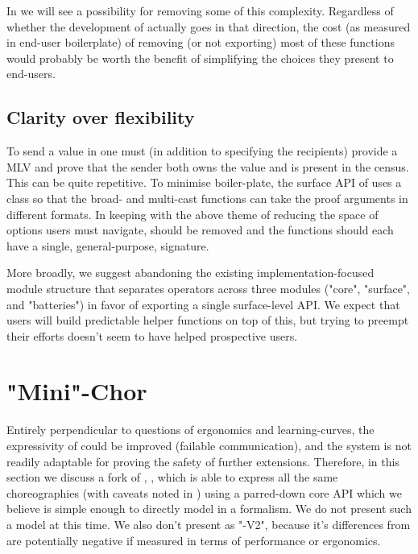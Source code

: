 In  we will see a possibility for removing some of this complexity.
Regardless of whether the development of \MultiChor actually goes in that direction,
the cost (as measured in end-user boilerplate) of removing (or not exporting) most of these functions
would probably be worth the benefit of simplifying the choices they present to end-users.

\subsection{Clarity over flexibility}

To send a value in \MultiChor one must (in addition to specifying the recipients)
provide a MLV and prove that the sender both owns the value and is present in the census.
This can be quite repetitive.
To minimise boiler-plate, the surface API of \MultiChor uses a class 
so that the broad- and multi-cast functions can take the proof arguments in different formats.
In keeping with the above theme of reducing the space of options users must navigate,
 should be removed and the functions should each have a single, general-purpose, signature.

More broadly, we suggest abandoning the existing implementation-focused module structure
that separates operators across three modules ("core", "surface", and "batteries")
in favor of exporting a single surface-level API.
We expect that users will build predictable helper functions on top of this,
but trying to preempt their efforts doesn't seem to have helped prospective users.

\section{"Mini"-Chor}
\label{sec:future-implementation}

Entirely perpendicular to questions of ergonomics and learning-curves, the expressivity of \MultiChor could be improved
(\eg failable communication),
and the \HLSCentral system is not readily adaptable for proving the safety of further extensions.
Therefore, in this section we discuss a fork of \MultiChor, \minichor,
which is able to express all the same choreographies (with caveats noted in )
using a parred-down core API which we believe is simple enough to directly model in a formalism.
We do not present such a model at this time.
We also don't present \minichor as "\MultiChor-V2",
because it's differences from \MultiChor are potentially negative if measured in terms of performance or ergonomics.


